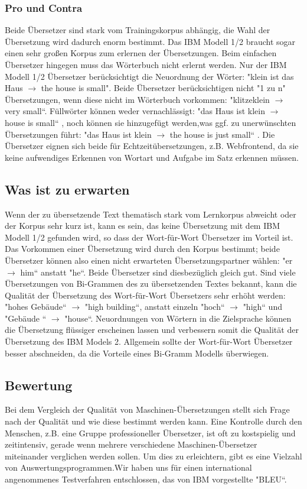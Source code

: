 \documentclass[12pt]{amsart}
\begin{document}
\subsubsection{Pro und Contra}
Beide Übersetzer sind stark vom Trainingskorpus abhängig, die Wahl der Übersetzung wird dadurch enorm bestimmt. Das IBM Modell 1/2 braucht sogar einen sehr großen Korpus zum erlernen der Übersetzungen.
Beim einfachen Übersetzer hingegen muss das Wörterbuch nicht erlernt werden. Nur der IBM Modell 1/2 Übersetzer berücksichtigt die Neuordnung der Wörter: "klein ist das Haus $\rightarrow$ the house is small".
Beide Übersetzer berücksichtigen nicht "1 zu n" Übersetzungen, wenn diese nicht im Wörterbuch vorkommen: "klitzeklein $\rightarrow$ very small“.
Füllwörter können weder vernachlässigt: "das Haus ist klein $\rightarrow$ house is small“ , noch können sie
hinzugefügt werden,was ggf. zu unerwünschten Übersetzungen führt: "das Haus ist klein $\rightarrow$ the house is just small“ .
Die Übersetzer eignen sich beide für Echtzeitübersetzungen, z.B. Webfrontend, da sie keine aufwendiges Erkennen von Wortart und Aufgabe im Satz erkennen müssen.

\subsection{Was ist zu erwarten}
Wenn der zu übersetzende Text thematisch stark vom Lernkorpus abweicht oder der Korpus sehr kurz ist, kann es sein, das keine Übersetzung mit dem IBM Modell 1/2 gefunden wird, so dass der Wort-für-Wort Übersetzer im Vorteil ist. 
Das Vorkommen einer Übersetzung wird durch den Korpus bestimmt; beide Übersetzer können also einen nicht erwarteten Übersetzungspartner wählen: "er $\rightarrow$ him“ anstatt "he“. Beide Übersetzer sind diesbezüglich gleich gut. 
Sind viele Übersetzungen von Bi-Grammen des zu übersetzenden Textes bekannt, kann die Qualität der Übersetzung des Wort-für-Wort Übersetzers sehr erhöht werden: "hohes Gebäude“ $\rightarrow$ "high building“, anstatt einzeln "hoch“ $\rightarrow$ "high“ und "Gebäude “ $\rightarrow$ "house“.
Neuordnungen von Wörtern in die Zielsprache können die Übersetzung flüssiger erscheinen lassen und verbessern somit die Qualität der Übersetzung des IBM Models 2. Allgemein sollte der Wort-für-Wort Übersetzer besser abschneiden, da die Vorteile eines Bi-Gramm Modells überwiegen.

\subsection{Bewertung}
Bei dem Vergleich der Qualität von Maschinen-Übersetzungen stellt sich Frage nach der Qualität und wie diese bestimmt werden kann. Eine Kontrolle durch den Menschen, z.B. eine Gruppe professioneller Übersetzer, ist oft zu kostspielig und zeitintensiv, gerade wenn mehrere verschiedene Maschinen-Übersetzer miteinander verglichen werden sollen. Um dies zu erleichtern, gibt es eine Vielzahl von Auswertungsprogrammen.Wir haben uns für einen international angenommenes Testverfahren entschlossen, das von IBM vorgestellte "BLEU“.
\end{document}
